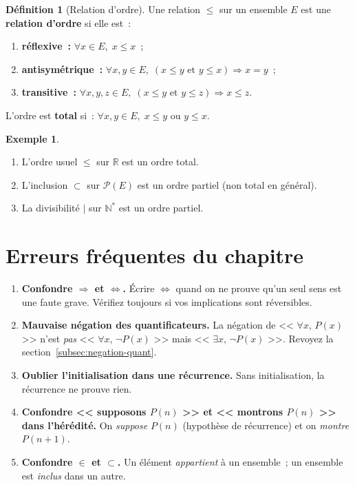 \documentclass[12pt,a4paper,openany]{book}
\theoremstyle{definition}
\newtheorem{definition}{Définition}[chapter]
\newtheorem{exemple}{Exemple}[chapter]
\newcommand{\N}{\mathbb{N}}
\newcommand{\R}{\mathbb{R}}
\begin{document}
\begin{definition}[Relation d'ordre]\label{def:rel-ordre}
  Une relation $\leq$ sur un ensemble $E$ est une \textbf{relation d'ordre} si elle est~:
  \begin{enumerate}[label=(\roman*)]
    \item \textbf{réflexive~:} $\forall x \in E,\; x \leq x$~;
    \item \textbf{antisymétrique~:} $\forall x, y \in E,\; (x \leq y \text{ et } y \leq x) \Rightarrow x = y$~;
    \item \textbf{transitive~:} $\forall x, y, z \in E,\; (x \leq y \text{ et } y \leq z) \Rightarrow x \leq z$.
  \end{enumerate}
  L'ordre est \textbf{total} si~: $\forall x, y \in E,\; x \leq y \text{ ou } y \leq x$.
\end{definition}

\begin{exemple}\label{ex:ordres}
  \begin{enumerate}[label=(\alph*)]
    \item L'ordre usuel $\leq$ sur $\R$ est un ordre total.
    \item L'inclusion $\subset$ sur $\mathcal{P}(E)$ est un ordre partiel (non total en général).
    \item La divisibilité $\mid$ sur $\N^*$ est un ordre partiel.
  \end{enumerate}
\end{exemple}


\section*{Erreurs fréquentes du chapitre}

\begin{errmark}
  \begin{enumerate}
    \item \textbf{Confondre $\Rightarrow$ et $\Leftrightarrow$.} Écrire $\Leftrightarrow$ quand on ne prouve qu'un seul sens est une faute grave. Vérifiez toujours si vos implications sont réversibles.
    \item \textbf{Mauvaise négation des quantificateurs.} La négation de << $\forall x,\, P(x)$ >> n'est \emph{pas} << $\forall x,\, \lnot P(x)$ >> mais << $\exists x,\, \lnot P(x)$ >>. Revoyez la section~\ref{subsec:negation-quant}.
    \item \textbf{Oublier l'initialisation dans une récurrence.} Sans initialisation, la récurrence ne prouve rien.
    \item \textbf{Confondre << supposons $P(n)$ >> et << montrons $P(n)$ >> dans l'hérédité.} On \emph{suppose} $P(n)$ (hypothèse de récurrence) et on \emph{montre} $P(n+1)$.
    \item \textbf{Confondre $\in$ et $\subset$.} Un élément \emph{appartient} à un ensemble~; un ensemble est \emph{inclus} dans un autre.
  \end{enumerate}
\end{errmark}
\end{document}
